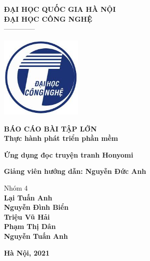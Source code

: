 \documentclass[./main.tex]{subfiles}
\begin{document}
\begin{titlepage}	
	\begin{center}
		\textbf{ĐẠI HỌC QUỐC GIA HÀ NỘI}\\
		\textbf{ĐẠI HỌC CÔNG NGHỆ}\\
		--------------
	
		\vspace*{30pt}
		
		\includegraphics[width=0.3\textwidth]{./images/uet.jpg}
		
		\vspace*{50pt}
		
		\textbf{BÁO CÁO BÀI TẬP LỚN 
			\\ Thực hành phát triển phần mềm}
		\vspace*{30pt}
		
		\textbf{Ứng dụng đọc truyện tranh Honyomi\\}

		\vspace*{50pt}
		
		\textbf{Giảng viên hướng dẫn: Nguyễn Đức Anh}
		
		\vspace*{30pt}
		
		Nhóm 4 \\
		\textbf{Lại Tuấn Anh\\
				Nguyễn Đình Biển\\
				Triệu Vũ Hải \\
				Phạm Thị Dân \\
				Nguyễn Tuấn Anh\\
		}
		
		\vspace*{40pt}
	\end{center}
	
	
	\begin{center}
		\textbf{Hà Nội, 2021}
	\end{center}
\end{titlepage}
\end{document}
